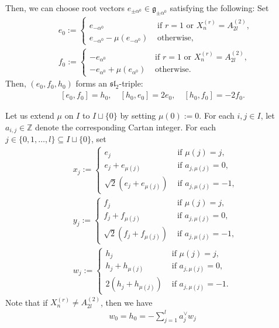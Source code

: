 \documentclass[12pt,a4paper]{amsart}
\theoremstyle{definition}
\numberwithin{equation}{subsection}
\begin{document}
Then, we can choose root vectors $e_{\pm \alpha^0} \in \mathfrak{g}_{\pm \alpha^0}$ satisfying the following:
Set
\begin{align*}
  &e_0 := \begin{cases}
    e_{-\alpha^0} & \text{ if } r = 1 \text{ or } X_n^{(r)} = A_{2l}^{(2)}, \\
    e_{-\alpha^0} - \mu(e_{-\alpha^0}) & \text{ otherwise},
  \end{cases} \\
  &f_0 := \begin{cases}
    -e_{\alpha^0} & \text{ if } r = 1 \text{ or } X_n^{(r)} = A_{2l}^{(2)}, \\
    -e_{\alpha^0} + \mu(e_{\alpha^0}) & \text{ otherwise}.
  \end{cases}
\end{align*}
Then, $(e_0,f_0,h_0)$ forms an $\mathfrak{sl}_2$-triple:
\begin{align}\label{eq: sl2 triple 0}
  [e_0,f_0] = h_0, \quad [h_0,e_0] = 2e_0, \quad [h_0,f_0] = -2f_0.
\end{align}

Let us extend $\mu$ on $I$ to $I \sqcup \{ 0 \}$ by setting $\mu(0) := 0$.
For each $i,j \in I$, let $a_{i,j} \in \mathbb{Z}$ denote the corresponding Cartan integer.
For each $j \in \{ 0,1,\dots,l \} \subseteq I \sqcup \{ 0 \}$, set
\begin{align*}
  &x_j := \begin{cases}
    e_j & \text{ if } \mu(j) = j, \\
    e_j + e_{\mu(j)} & \text{ if } a_{j,\mu(j)} = 0, \\
    \sqrt{2}(e_j + e_{\mu(j)}) & \text{ if } a_{j,\mu(j)} = -1,
  \end{cases} \\
  &y_j := \begin{cases}
    f_j & \text{ if } \mu(j) = j, \\
    f_j + f_{\mu(j)} & \text{ if } a_{j,\mu(j)} = 0, \\
    \sqrt{2}(f_j + f_{\mu(j)}) & \text{ if } a_{j,\mu(j)} = -1,
  \end{cases} \\
  &w_j := \begin{cases}
    h_j & \text{ if } \mu(j) = j, \\
    h_j + h_{\mu(j)} & \text{ if } a_{j,\mu(j)} = 0, \\
    2(h_j + h_{\mu(j)}) & \text{ if } a_{j,\mu(j)} = -1.
  \end{cases}
\end{align*}
Note that if $X_n^{(r)} \neq A_{2l}^{(2)}$, then we have
\begin{align}\label{eq: w0}
  w_0 = h_0 = -\sum_{j=1}^l a_j^\vee w_j
\end{align}
\end{document}
